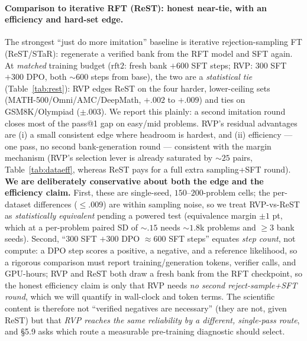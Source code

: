 \paragraph{Comparison to iterative RFT (ReST): honest near-tie, with an efficiency and hard-set edge.}
The strongest ``just do more imitation'' baseline is iterative rejection-sampling FT
(ReST/STaR): regenerate a verified bank from the RFT model and SFT again. At \emph{matched} training budget
($\text{rft2}$: fresh bank $+600$ SFT steps; RVP: $300$ SFT $+300$ DPO, both $\sim\!600$ steps from base),
the two are a \emph{statistical tie} (Table~\ref{tab:rest}): RVP edges ReST on the four harder,
lower-ceiling sets (MATH-500/Omni/AMC/DeepMath, $+.002$ to $+.009$) and ties on GSM8K/Olympiad ($\pm.003$).
We report this plainly: a second imitation round closes most of the pass@1 gap on easy/mid problems. RVP's
residual advantages are (i) a small consistent edge where headroom is hardest, and (ii) efficiency --- one
pass, no second bank-generation round --- consistent with the margin mechanism (RVP's selection lever is
already saturated by $\sim\!25$ pairs, Table~\ref{tab:dataeff}, whereas ReST pays for a full extra
sampling+SFT round). \textbf{We are deliberately conservative about both the edge and the efficiency
claim.} First, these are single-seed, $150$--$200$-problem cells; the per-dataset differences ($\le\!.009$)
are within sampling noise, so we treat RVP-vs-ReST as \emph{statistically equivalent} pending a powered test
(equivalence margin $\pm1$ pt, which at a per-problem paired SD of $\sim\!.15$ needs $\sim\!1.8$k problems
and $\ge\!3$ bank seeds). Second, ``$300$ SFT $+300$ DPO $\approx600$ SFT steps'' equates \emph{step count},
not compute: a DPO step scores a positive, a negative, and a reference likelihood, so a rigorous comparison
must report training/generation tokens, verifier calls, and GPU-hours; RVP and ReST both draw a fresh bank
from the RFT checkpoint, so the honest efficiency claim is only that RVP needs \emph{no second
reject-sample+SFT round}, which we will quantify in wall-clock and token terms. The scientific content is
therefore not ``verified negatives are necessary'' (they are not, given ReST) but that \emph{RVP reaches the
same reliability by a different, single-pass route}, and \S5.9 asks which route a measurable pre-training
diagnostic should select.

